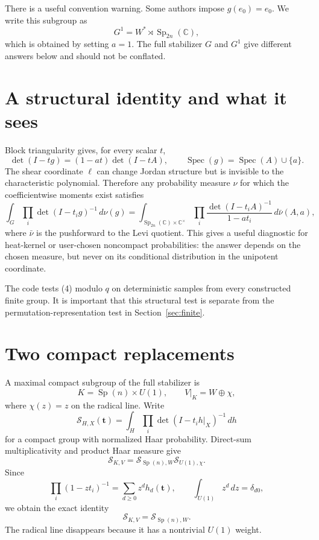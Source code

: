 \documentclass[11pt]{article}
\newcommand{\Sfun}{\mathcal S}
\newcommand{\Sp}{\operatorname{Sp}}
\newcommand{\Spec}{\operatorname{Spec}}
\begin{document}
There is a useful convention warning. Some authors impose $g(e_0)=e_0$. We
write this subgroup as
\begin{equation}
 G^1=W^*\rtimes\Sp_{2n}(\mathbb C),
\end{equation}
which is obtained by setting $a=1$. The full stabilizer $G$ and $G^1$ give
different answers below and should not be conflated.

\section{A structural identity and what it sees}

Block triangularity gives, for every scalar $t$,
\begin{equation}
 \det(I-tg)=(1-at)\det(I-tA),\qquad
 \Spec(g)=\Spec(A)\cup\{a\}.
\end{equation}
The shear coordinate $\ell$ can change Jordan structure but is invisible to
the characteristic polynomial. Therefore any probability measure $\nu$ for
which the coefficientwise moments exist satisfies
\begin{equation}
 \int_G\prod_i\det(I-t_i g)^{-1}\,d\nu(g)
 =\int_{\Sp_{2n}(\mathbb C)\times\mathbb C^\times}
 \prod_i\frac{\det(I-t_iA)^{-1}}{1-at_i}\,d\bar\nu(A,a),
\end{equation}
where $\bar\nu$ is the pushforward to the Levi quotient. This gives a useful
diagnostic for heat-kernel or user-chosen noncompact probabilities: the answer
depends on the chosen measure, but never on its conditional distribution in
the unipotent coordinate.

The code tests (4) modulo $q$ on deterministic samples from every constructed
finite group. It is important that this structural test is separate from the
permutation-representation test in Section~\ref{sec:finite}.

\section{Two compact replacements}

A maximal compact subgroup of the full stabilizer is
\[
 K=\Sp(n)\times U(1),\qquad V|_K=W\oplus\chi,
\]
where $\chi(z)=z$ on the radical line. Write
\[
 \Sfun_{H,X}(\mathbf t)=\int_H\prod_i\det(I-t_i h|_X)^{-1}\,dh
\]
for a compact group with normalized Haar probability. Direct-sum
multiplicativity and product Haar measure give
\[
 \Sfun_{K,V}=\Sfun_{\Sp(n),W}\Sfun_{U(1),\chi}.
\]
Since
\[
 \prod_i(1-zt_i)^{-1}=\sum_{d\ge0}z^d h_d(\mathbf t),
 \qquad \int_{U(1)}z^d\,dz=\delta_{d0},
\]
we obtain the exact identity
\begin{equation}
 \boxed{\Sfun_{K,V}=\Sfun_{\Sp(n),W}.}
\end{equation}
The radical line disappears because it has a nontrivial $U(1)$ weight.
\end{document}
